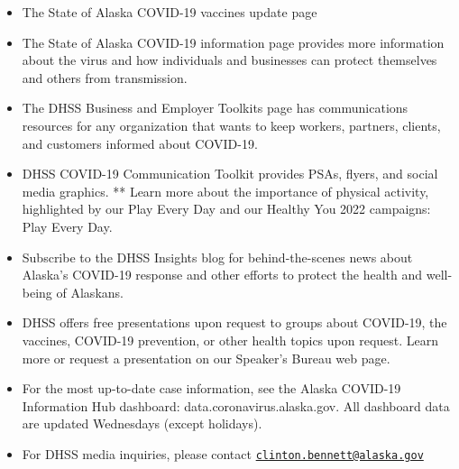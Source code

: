\documentclass[
]{article}
\begin{document}
\begin{itemize}
\item
  The State of Alaska COVID-19 vaccines update page
\item
  The State of Alaska COVID-19 information page provides more
  information about the virus and how individuals and businesses can
  protect themselves and others from transmission.
\item
  The DHSS Business and Employer Toolkits page has communications
  resources for any organization that wants to keep workers, partners,
  clients, and customers informed about COVID-19.
\item
  DHSS COVID-19 Communication Toolkit provides PSAs, flyers, and social
  media graphics. ** Learn more about the importance of physical
  activity, highlighted by our Play Every Day and our Healthy You 2022
  campaigns: Play Every Day.
\item
  Subscribe to the DHSS Insights blog for behind-the-scenes news about
  Alaska's COVID-19 response and other efforts to protect the health and
  well-being of Alaskans.
\item
  DHSS offers free presentations upon request to groups about COVID-19,
  the vaccines, COVID-19 prevention, or other health topics upon
  request. Learn more or request a presentation on our Speaker's Bureau
  web page.
\item
  For the most up-to-date case information, see the Alaska COVID-19
  Information Hub dashboard: data.coronavirus.alaska.gov. All dashboard
  data are updated Wednesdays (except holidays).
\item
  For DHSS media inquiries, please contact
  \href{mailto:clinton.bennett@alaska.gov}{\nolinkurl{clinton.bennett@alaska.gov}}
\end{itemize}

~

~

~
\end{document}
